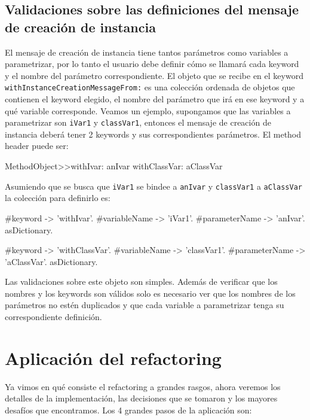 \subsection*{Validaciones sobre las definiciones del mensaje de creación de instancia}

El mensaje de creación de instancia tiene tantos parámetros como variables a parametrizar, por lo
tanto el usuario debe definir cómo se llamará cada keyword y el nombre del parámetro
correspondiente. El objeto que se recibe en el keyword \lstinline{withInstanceCreationMessageFrom:}
es una colección ordenada de objetos que contienen el keyword elegido, el nombre del parámetro que
irá en ese keyword y a qué variable corresponde. Veamos un ejemplo, supongamos que las variables
a parametrizar son \lstinline{iVar1} y \lstinline{classVar1}, entonces el mensaje de creación
de instancia deberá tener 2 keywords y sus correspondientes parámetros. El method header puede ser:

\begin{code}
MethodObject>>withIvar: anIvar withClassVar: aClassVar
\end{code}

Asumiendo que se busca que \lstinline{iVar1} se bindee a \lstinline{anIvar} y \lstinline{classVar1} a
\lstinline{aClassVar} la colección para definirlo es:

\begin{code}
    {
        {
            #keyword -> 'withIvar'.
            #variableName -> 'iVar1'.
            #parameterName -> 'anIvar'.
        } asDictionary.

        {
            #keyword -> 'withClassVar'.
            #variableName -> 'classVar1'.
            #parameterName -> 'aClassVar'.
        } asDictionary.
    }
\end{code}

Las validaciones sobre este objeto son simples. Además de verificar que los nombres y los keywords
son válidos solo es necesario ver que los nombres de los parámetros no estén duplicados y que cada
variable a parametrizar tenga su correspondiente definición.


\section{Aplicación del refactoring}

Ya vimos en qué consiste el refactoring a grandes rasgos, ahora veremos los detalles de la implementación,
las decisiones que se tomaron y los mayores desafíos que encontramos. Los 4 grandes pasos de la aplicación
son:


